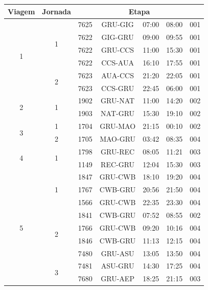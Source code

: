 \documentclass[12pt,a4paper]{article}
\begin{document}
\begin{table}[!htb]
	\begin{center}
		\begin{tabular}{|c|c|ccccc|}
			\hline
			{\bf Viagem} & {\bf Jornada} & \multicolumn{5}{|c|}{\bf Etapa} \\ \hline \hline
			\multirow{6}{*}{1} & \multirow{4}{*}{1}  
			  & 7625 & GRU-GIG & 07:00 & 08:00 & 001 \\
			& & 7622 & GIG-GRU & 09:00 & 09:55 & 001 \\
			& & 7622 & GRU-CCS & 11:00 & 15:30 & 001 \\
			& & 7622 & CCS-AUA & 16:10 & 17:55 & 001 \\ \cline{2-7}
			                       & \multirow{2}{*}{2}
				& 7623 & AUA-CCS & 21:20 & 22:05 & 001 \\
			& &	7623 & CCS-GRU & 22:45 & 06:00 & 001 \\ \hline \hline
			\multirow{2}{*}{2} & \multirow{2}{*}{1}  		
				& 1902 & GRU-NAT & 11:00 & 14:20 & 002 \\
			& & 1903 & NAT-GRU & 15:30 & 19:10 & 002 \\ \hline \hline
			\multirow{2}{*}{3} & \multirow{1}{*}{1}  		
				& 1704 & GRU-MAO & 21:15 & 00:10 & 002 \\ \cline{2-7}
                           	& \multirow{1}{*}{2}
				&	1705 & MAO-GRU & 03:42 & 08:35 & 004 \\ \hline \hline
			\multirow{2}{*}{4} & \multirow{2}{*}{1}  		
				& 1798 & GRU-REC & 08:05 & 11:21 & 003 \\
			& & 1149 & REC-GRU & 12:04 & 15:30 & 003 \\ \hline \hline			
			\multirow{10}{*}{5} & \multirow{3}{*}{1}  
				&	1847 & GRU-CWB & 18:10 & 19:20 & 004 \\
			& &	1767 & CWB-GRU & 20:56 & 21:50 & 004 \\
			& &	1566 & GRU-CWB & 22:35 & 23:30 & 004 \\ \cline{2-7}
                           		& \multirow{4}{*}{2}
				&	1841 & CWB-GRU & 07:52 & 08:55 & 002 \\
			&	&	1766 & GRU-CWB & 09:20 & 10:16 & 004 \\
			&	&	1846 & CWB-GRU & 11:13 & 12:15 & 004 \\
			&	&	7480 & GRU-ASU & 13:05 & 13:50 & 004 \\ \cline{2-7}
                           		& \multirow{3}{*}{3}
				&	7481 & ASU-GRU & 14:30 & 17:25 & 004 \\
			&	&	7680 & GRU-AEP & 18:25 & 21:15 & 003 \\

\end{tabular}
\end{center}
\end{table}
\end{document}
